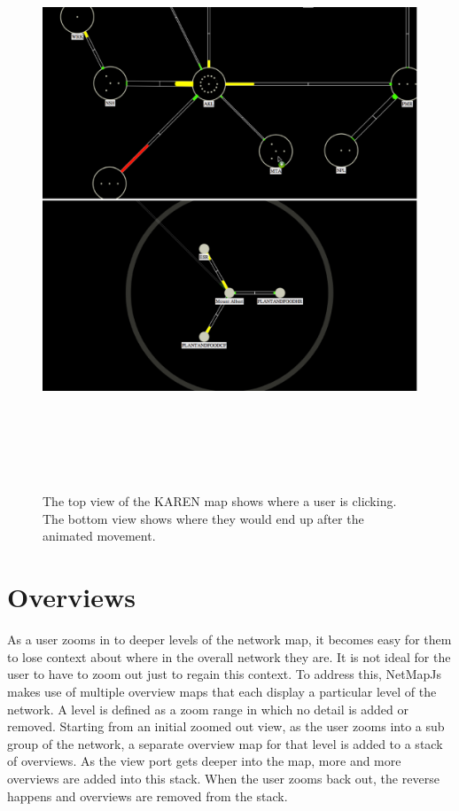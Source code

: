 \documentclass[11pt, a4paper]{report}
\begin{document}
\begin{figure}
\centering
\includegraphics[width=170mm,height=173.22mm]{assets/nav1-2.eps}
\caption{The top view of the KAREN map shows where a user is clicking. The bottom
view shows where they would end up after the animated movement.}
\label{fig:nav1.2}
\end{figure}

\section{Overviews}
\label{sec:overviews.vis}

As a user zooms in to deeper levels of the network map, it becomes easy for them
to lose context about where in the overall network they are. It is not ideal for
the user to have to zoom out just to regain this context. To address this,
NetMapJs makes use of multiple overview maps that each display a particular
level of the network. A level is defined as a zoom range in which no detail is
added or removed. Starting from an initial zoomed out view, as the user zooms
into a sub group of the network, a separate overview map for that level is added
to a stack of overviews. As the view port gets deeper into the map, more and
more overviews are added into this stack. When the user zooms back out, the
reverse happens and overviews are removed from the stack.
\end{document}
